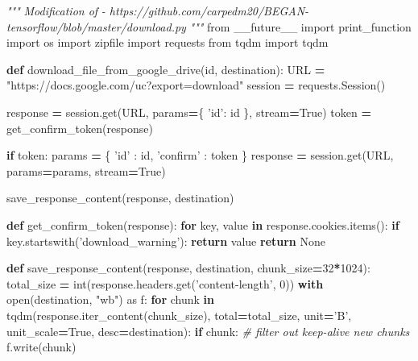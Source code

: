 \documentclass[]{book}
\newenvironment{Shaded}{\begin{snugshade}}{\end{snugshade}}
\newcommand{\KeywordTok}[1]{\textcolor[rgb]{0.13,0.29,0.53}{\textbf{#1}}}
\newcommand{\DecValTok}[1]{\textcolor[rgb]{0.00,0.00,0.81}{#1}}
\newcommand{\StringTok}[1]{\textcolor[rgb]{0.31,0.60,0.02}{#1}}
\newcommand{\ImportTok}[1]{#1}
\newcommand{\CommentTok}[1]{\textcolor[rgb]{0.56,0.35,0.01}{\textit{#1}}}
\newcommand{\VariableTok}[1]{\textcolor[rgb]{0.00,0.00,0.00}{#1}}
\newcommand{\ControlFlowTok}[1]{\textcolor[rgb]{0.13,0.29,0.53}{\textbf{#1}}}
\newcommand{\OperatorTok}[1]{\textcolor[rgb]{0.81,0.36,0.00}{\textbf{#1}}}
\newcommand{\BuiltInTok}[1]{#1}
\newcommand{\NormalTok}[1]{#1}
\theoremstyle{definition}
\theoremstyle{definition}
\theoremstyle{definition}
\theoremstyle{remark}
\begin{document}
\begin{Shaded}
\begin{Highlighting}[]
\CommentTok{"""}
\CommentTok{Modification of}
\CommentTok{- https://github.com/carpedm20/BEGAN-tensorflow/blob/master/download.py}
\CommentTok{"""}
\ImportTok{from}\NormalTok{ __future__ }\ImportTok{import}\NormalTok{ print_function}
\ImportTok{import}\NormalTok{ os}
\ImportTok{import}\NormalTok{ zipfile}
\ImportTok{import}\NormalTok{ requests}
\ImportTok{from}\NormalTok{ tqdm }\ImportTok{import}\NormalTok{ tqdm}

\KeywordTok{def}\NormalTok{ download_file_from_google_drive(}\BuiltInTok{id}\NormalTok{, destination):}
\NormalTok{    URL }\OperatorTok{=} \StringTok{"https://docs.google.com/uc?export=download"}
\NormalTok{    session }\OperatorTok{=}\NormalTok{ requests.Session()}

\NormalTok{    response }\OperatorTok{=}\NormalTok{ session.get(URL, params}\OperatorTok{=}\NormalTok{\{ }\StringTok{'id'}\NormalTok{: }\BuiltInTok{id}\NormalTok{ \}, stream}\OperatorTok{=}\VariableTok{True}\NormalTok{)}
\NormalTok{    token }\OperatorTok{=}\NormalTok{ get_confirm_token(response)}

    \ControlFlowTok{if}\NormalTok{ token:}
\NormalTok{        params }\OperatorTok{=}\NormalTok{ \{ }\StringTok{'id'}\NormalTok{ : }\BuiltInTok{id}\NormalTok{, }\StringTok{'confirm'}\NormalTok{ : token \}}
\NormalTok{        response }\OperatorTok{=}\NormalTok{ session.get(URL, params}\OperatorTok{=}\NormalTok{params, stream}\OperatorTok{=}\VariableTok{True}\NormalTok{)}

\NormalTok{    save_response_content(response, destination)    }

\KeywordTok{def}\NormalTok{ get_confirm_token(response):}
    \ControlFlowTok{for}\NormalTok{ key, value }\KeywordTok{in}\NormalTok{ response.cookies.items():}
        \ControlFlowTok{if}\NormalTok{ key.startswith(}\StringTok{'download_warning'}\NormalTok{):}
            \ControlFlowTok{return}\NormalTok{ value}
    \ControlFlowTok{return} \VariableTok{None}

\KeywordTok{def}\NormalTok{ save_response_content(response, destination, chunk_size}\OperatorTok{=}\DecValTok{32}\OperatorTok{*}\DecValTok{1024}\NormalTok{):}
\NormalTok{    total_size }\OperatorTok{=} \BuiltInTok{int}\NormalTok{(response.headers.get(}\StringTok{'content-length'}\NormalTok{, }\DecValTok{0}\NormalTok{))}
    \ControlFlowTok{with} \BuiltInTok{open}\NormalTok{(destination, }\StringTok{"wb"}\NormalTok{) }\ImportTok{as}\NormalTok{ f:}
        \ControlFlowTok{for}\NormalTok{ chunk }\KeywordTok{in}\NormalTok{ tqdm(response.iter_content(chunk_size), total}\OperatorTok{=}\NormalTok{total_size, }
\NormalTok{                          unit}\OperatorTok{=}\StringTok{'B'}\NormalTok{, unit_scale}\OperatorTok{=}\VariableTok{True}\NormalTok{, desc}\OperatorTok{=}\NormalTok{destination):}
            \ControlFlowTok{if}\NormalTok{ chunk: }\CommentTok{# filter out keep-alive new chunks}
\NormalTok{                f.write(chunk)}


\end{Highlighting}
\end{Shaded}
\end{document}
